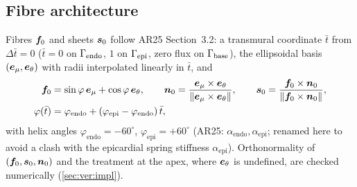 \subsection{Fibre architecture}\label{sec:fibres}
Fibres $\bm{f}_0$ and sheets $\bm{s}_0$ follow AR25 Section~3.2: a transmural
coordinate $\bar t$ from $\Delta\bar t=0$ ($\bar t=0$ on $\Gamma_{\mathrm{endo}}$, $1$ on
$\Gamma_{\mathrm{epi}}$, zero flux on $\Gamma_{\mathrm{base}}$), the ellipsoidal basis $(\bm{e}_\mu,\bm{e}_\theta)$
with radii interpolated linearly in $\bar t$, and
\begin{equation}
\begin{aligned}
\bm{f}_0 &= \sin\varphi\,\bm{e}_\mu + \cos\varphi\,\bm{e}_\theta,\qquad
\bm{n}_0 = \frac{\bm{e}_\mu\times\bm{e}_\theta}{\|\bm{e}_\mu\times\bm{e}_\theta\|},\qquad
\bm{s}_0 = \frac{\bm{f}_0\times\bm{n}_0}{\|\bm{f}_0\times\bm{n}_0\|},\\
\varphi(\bar t) &= \varphi_{\mathrm{endo}} + (\varphi_{\mathrm{epi}}-\varphi_{\mathrm{endo}})\,\bar t,
\end{aligned}
\end{equation}
with helix angles $\varphi_{\mathrm{endo}}=-60^\circ$,
$\varphi_{\mathrm{epi}}=+60^\circ$ (AR25: $\alpha_{\mathrm{endo}},\alpha_{\mathrm{epi}}$;
renamed here to avoid a clash with the epicardial spring stiffness
$\alpha_{\mathrm{epi}}$). Orthonormality of $(\bm{f}_0,\bm{s}_0,\bm{n}_0)$ and the
treatment at the apex, where $\bm{e}_\theta$ is undefined, are checked
numerically (\cref{sec:ver:impl}).

